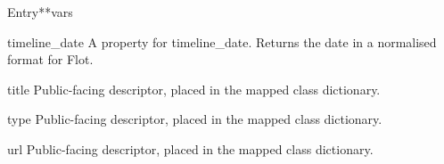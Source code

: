 \documentclass[letterpaper,10pt,english]{manual}
\begin{document}
\begin{classdesc}{Entry}{**vars}
\hypertarget{webscavator.model.models.Entry.timeline_date}{}\begin{memberdesc}{timeline\_date}
A property for timeline\_date. Returns the date in a normalised format for Flot.
\end{memberdesc}

\hypertarget{webscavator.model.models.Entry.title}{}\begin{memberdesc}{title}
Public-facing descriptor, placed in the mapped class dictionary.
\end{memberdesc}

\hypertarget{webscavator.model.models.Entry.type}{}\begin{memberdesc}{type}
Public-facing descriptor, placed in the mapped class dictionary.
\end{memberdesc}

\hypertarget{webscavator.model.models.Entry.url}{}\begin{memberdesc}{url}
Public-facing descriptor, placed in the mapped class dictionary.
\end{memberdesc}
\end{classdesc}
\end{document}
